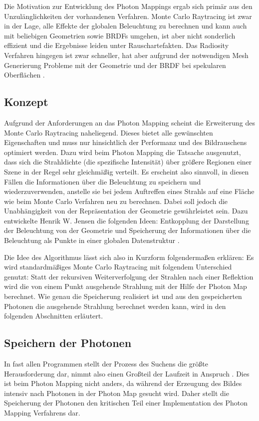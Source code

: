 \documentclass[a4paper,twocolumn,abstracton]{scrartcl}
\begin{document}
Die Motivation zur Entwicklung des Photon Mappings ergab sich primär aus den Unzulänglichkeiten der vorhandenen Verfahren. Monte Carlo Raytracing ist zwar in der Lage, alle Effekte der globalen Beleuchtung zu berechnen und kann auch mit beliebigen Geometrien sowie BRDFs umgehen, ist aber nicht sonderlich effizient und die Ergebnisse leiden unter Rauschartefakten. Das Radiosity Verfahren hingegen ist zwar schneller, hat aber aufgrund der notwendigen Mesh Generierung Probleme mit der Geometrie und der BRDF bei spekularen Oberflächen \citep{Jensen2001}.

\subsection{Konzept}
Aufgrund der Anforderungen an das Photon Mapping scheint die Erweiterung des Monte Carlo Raytracing naheliegend. Dieses bietet alle gewünschten Eigenschaften und muss nur hinsichtlich der Performanz und des Bildrauschens optimiert werden. Dazu wird beim Photon Mapping die Tatsache ausgenutzt, dass sich die Strahldichte (die spezifische Intensität) über größere Regionen einer Szene in der Regel sehr gleichmäßig verteilt. Es erscheint also sinnvoll, in diesen Fällen die Informationen über die Beleuchtung zu speichern und wiederzuverwenden, anstelle sie bei jedem Auftreffen eines Strahls auf eine Fläche wie beim Monte Carlo Verfahren neu zu berechnen. Dabei soll jedoch die Unabhängigkeit von der Repräsentation der Geometrie gewährleistet sein. Dazu entwickelte Henrik W. Jensen die folgenden Ideen: Entkopplung der Darstellung der Beleuchtung von der Geometrie und Speicherung der Informationen über die Beleuchtung als Punkte in einer globalen Datenstruktur \citep{Jensen2001}.

Die Idee des Algorithmus lässt sich also in Kurzform folgendermaßen erklären: Es wird standardmäßiges Monte Carlo Raytracing mit folgendem Unterschied genutzt: Statt der rekursiven Weiterverfolgung der Strahlen nach einer Reflektion wird die von einem Punkt ausgehende Strahlung mit der Hilfe der Photon Map berechnet. Wie genau die Speicherung realisiert ist und aus den gespeicherten Photonen die ausgehende Strahlung berechnet werden kann, wird in den folgenden Abschnitten erläutert.

\subsection{Speichern der Photonen}
In fast allen Programmen stellt der Prozess des Suchens die größte Herausforderung dar, nimmt also einen Großteil der Laufzeit in Anspruch \citep{Knuth1997}. Dies ist beim Photon Mapping nicht anders, da während der Erzeugung des Bildes intensiv nach Photonen in der Photon Map gesucht wird. Daher stellt die Speicherung der Photonen den kritischen Teil einer Implementation des Photon Mapping Verfahrens dar.
\end{document}
